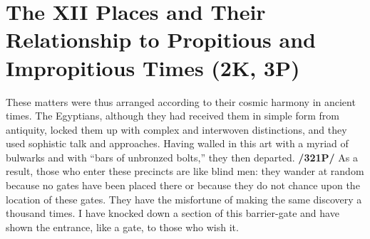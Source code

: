 \section{The XII Places and Their Relationship to Propitious and Impropitious Times (2K, 3P)}

These matters were thus arranged according to their cosmic harmony in ancient times. The Egyptians, although they had received them in simple form from antiquity, locked them up with complex and interwoven distinctions, and they used sophistic talk and approaches. 
Having walled in this art with a myriad of bulwarks and with “bars of unbronzed bolts,” they then departed. \textbf{/321P/} As a result, those who enter these precincts are like blind men: they wander at random because no gates have been placed there or because they do not chance upon the location of these gates. They have the misfortune of making the same discovery a thousand times. I have knocked down a section of this barrier-gate and have shown the entrance, like a gate, to those who wish it. 

